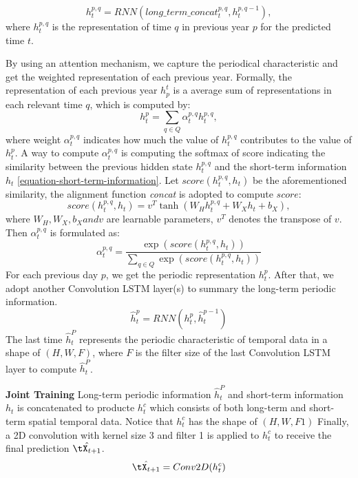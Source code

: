 \[ h_t^{p, q} = RNN(long\_term\_concat_t^{p, q}, h_t^{p, q - 1}), \]
where $h_t^{p, q}$ is the representation of time $q$ in previous year $p$ for the predicted time $t$.

By using an attention mechanism, we capture the periodical characteristic and get the weighted representation of each previous year. Formally, the representation of each previous year $h_p^t$ is a average sum of representations in each relevant time $q$, which is computed by:
\[ h_t^p = \sum_{q \in Q}{\alpha_t^{p,q} h_t^{p,q}}, \]
where weight $\alpha_t^{p,q}$ indicates how much the value of $h_t^{p,q}$ contributes to the value of $h_t^p$. A way to compute $\alpha_t^{p,q}$ is computing the softmax of score indicating the similarity between the previous hidden state $h_t^{p,q}$ and the short-term information $h_t$ \eqref{equation-short-term-information}. Let $score(h_t^{p,q}, h_t)$ be the aforementioned similarity, the alignment function \textit{concat} is adopted to compute $score$:
\[ score(h_t^{p,q}, h_t) = v^T\tanh(W_H h_t^{p,q} + W_X h_t + b_X), \]
where $W_H, W_X, b_X and v$ are learnable parameters, $v^T$ denotes the transpose of $v$. Then $\alpha_t^{p,q}$ is formulated as:
\[ \alpha_t^{p,q} = \frac{\exp(score(h_t^{p,q}, h_t))}{\sum_{q \in Q}{\exp(score(h_t^{p,q}, h_t))}} \]
For each previous day $p$, we get the periodic representation $h_t^p$. After that, we adopt another Convolution LSTM layer(s) to summary the long-term periodic information.
\[ \hat{h}_t^p = RNN(h_t^p, \hat{h}_t^{p-1}) \]
The last time $\hat{h}_t^P$ represents the periodic characteristic of temporal data in a shape of $(H, W, F)$, where $F$ is the filter size of the last Convolution LSTM layer to compute $\hat{h}_t^P$.

\textbf{Joint Training}
Long-term periodic information $\hat{h}_t^P$ and short-term information $h_t$ is concatenated to producte $h_t^c$ which consists of both long-term and short-term spatial temporal data. Notice that $h_t^c$ has the shape of $(H, W, F1)$ Finally, a 2D convolution with kernel size 3 and filter 1 is applied to $h_t^c$ to receive the final prediction $\hat{\tX_{t+1}}$.
\[ \hat{\tX_{t+1}} = Conv2D(h_t^c) \]





